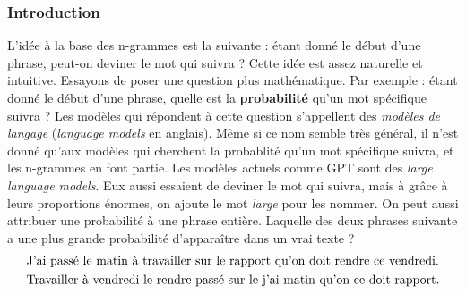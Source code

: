 \documentclass[11pt, a4paper]{report}
\begin{document}
  \subsubsection{Introduction}
  L'idée à la base des n-grammes est la suivante : étant donné le début d'une phrase, peut-on 
  deviner le mot qui suivra ? Cette idée est assez naturelle et intuitive. Essayons de poser 
  une question plus mathématique. Par exemple : étant donné le début d'une phrase, quelle est la \textbf{probabilité}
  qu'un mot spécifique suivra ? Les modèles qui répondent à cette question s'appellent des 
  \textit{modèles de langage} (\textit{language models} en anglais). Même si ce nom semble 
  très général, il n'est donné qu'aux modèles qui cherchent la probablité qu'un mot spécifique 
  suivra, et les n-grammes en font partie. Les modèles actuels comme GPT sont des \textit{large language models}. Eux aussi essaient 
  de deviner le mot qui suivra, mais à grâce à leurs proportions énormes, on ajoute le mot 
  \textit{large} pour les nommer. On peut aussi attribuer une probabilité à une phrase 
  entière. Laquelle des deux phrases suivante a une plus grande probabilité d'apparaître 
  dans un vrai texte ? 
  \begin{align*}
    &\textup{J'ai passé le matin à travailler sur le rapport qu'on doit rendre ce vendredi.} \\
    &\textup{Travailler à vendredi le rendre passé sur le j'ai matin qu'on ce doit rapport.}
  \end{align*}
  
\end{document}
